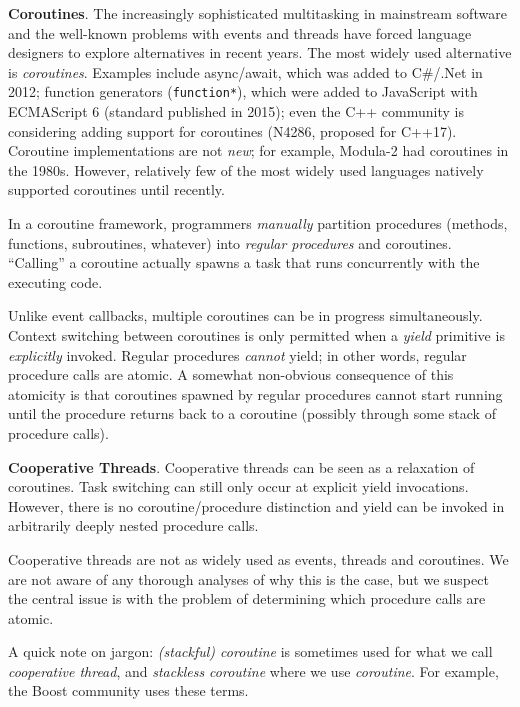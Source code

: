 \documentclass[9pt,preprint]{sigplanconf}
\begin{document}
\textbf{Coroutines}.
The increasingly sophisticated multitasking in mainstream software and the well-known problems with events and threads have forced language designers to explore alternatives in recent years.
The most widely used alternative is \emph{coroutines}\footnotemark{}.
Examples include async/await, which was added to C\#/.Net in 2012; function generators (\texttt{function*}), which were added to JavaScript with ECMAScript 6 (standard published in 2015); even the C++ community is considering adding support for coroutines (N4286, proposed for C++17).
Coroutine implementations are not \emph{new}; for example, Modula-2 had coroutines in the 1980s.
However, relatively few of the most widely used languages natively supported coroutines until recently.


In a coroutine framework, programmers \emph{manually} partition procedures (methods, functions, subroutines, whatever) into \emph{regular procedures} and coroutines.
``Calling'' a coroutine actually spawns a task that runs concurrently with the executing code.

Unlike event callbacks, multiple coroutines can be in progress simultaneously.
Context switching between coroutines is only permitted when a \emph{yield} primitive is \emph{explicitly} invoked.
Regular procedures \emph{cannot} yield; in other words, regular procedure calls are atomic.
A somewhat non-obvious consequence of this atomicity is that coroutines spawned by regular procedures cannot start running until the procedure returns back to a coroutine (possibly through some stack of procedure calls).

\textbf{Cooperative Threads}.
Cooperative threads can be seen as a relaxation of coroutines.
Task switching can still only occur at explicit yield invocations.
However, there is no coroutine/procedure distinction and yield can be invoked in arbitrarily deeply nested procedure calls.

Cooperative threads are not as widely used as events, threads and coroutines.
We are not aware of any thorough analyses of why this is the case, but we suspect the central issue is with the problem of determining which procedure calls are atomic.

A quick note on jargon: \emph{(stackful) coroutine} is sometimes used for what we call \emph{cooperative thread}, and \emph{stackless coroutine} where we use \emph{coroutine}.
For example, the Boost community uses these terms.
\end{document}
